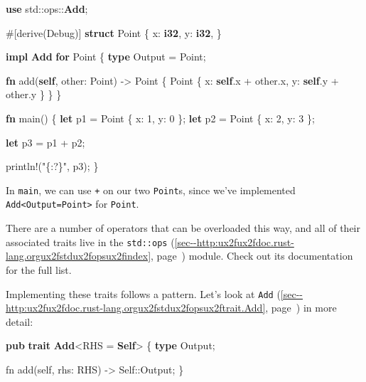 \documentclass[a4paper,]{book}
\renewcommand*{\hyperref}[2][\ar]{%
  \def\ar{#2}%
  #2 (\autoref{#1}, page~\pageref{#1})}
\newenvironment{Shaded}{\begin{snugshade}}{\end{snugshade}}
\newcommand{\KeywordTok}[1]{\textcolor[rgb]{0.13,0.29,0.53}{\textbf{{#1}}}}
\newcommand{\DecValTok}[1]{\textcolor[rgb]{0.00,0.00,0.81}{{#1}}}
\newcommand{\StringTok}[1]{\textcolor[rgb]{0.31,0.60,0.02}{{#1}}}
\newcommand{\OtherTok}[1]{\textcolor[rgb]{0.56,0.35,0.01}{{#1}}}
\newcommand{\NormalTok}[1]{{#1}}
\begin{document}
\begin{Shaded}
\begin{Highlighting}[]
\KeywordTok{use} \NormalTok{std::ops::}\KeywordTok{Add}\NormalTok{;}

\OtherTok{#[}\NormalTok{derive}\OtherTok{(}\NormalTok{Debug}\OtherTok{)]}
\KeywordTok{struct} \NormalTok{Point \{}
    \NormalTok{x: }\KeywordTok{i32}\NormalTok{,}
    \NormalTok{y: }\KeywordTok{i32}\NormalTok{,}
\NormalTok{\}}

\KeywordTok{impl} \KeywordTok{Add} \KeywordTok{for} \NormalTok{Point \{}
    \KeywordTok{type} \NormalTok{Output = Point;}

    \KeywordTok{fn} \NormalTok{add(}\KeywordTok{self}\NormalTok{, other: Point) -> Point \{}
        \NormalTok{Point \{ x: }\KeywordTok{self}\NormalTok{.x + other.x, y: }\KeywordTok{self}\NormalTok{.y + other.y \}}
    \NormalTok{\}}
\NormalTok{\}}

\KeywordTok{fn} \NormalTok{main() \{}
    \KeywordTok{let} \NormalTok{p1 = Point \{ x: }\DecValTok{1}\NormalTok{, y: }\DecValTok{0} \NormalTok{\};}
    \KeywordTok{let} \NormalTok{p2 = Point \{ x: }\DecValTok{2}\NormalTok{, y: }\DecValTok{3} \NormalTok{\};}

    \KeywordTok{let} \NormalTok{p3 = p1 + p2;}

    \OtherTok{println!}\NormalTok{(}\StringTok{"\{:?\}"}\NormalTok{, p3);}
\NormalTok{\}}
\end{Highlighting}
\end{Shaded}

In \texttt{main}, we can use \texttt{+} on our two \texttt{Point}s,
since we've implemented
\texttt{Add\textless{}Output=Point\textgreater{}} for \texttt{Point}.

There are a number of operators that can be overloaded this way, and all
of their associated traits live in the
\hyperref[sec--http:ux2fux2fdoc.rust-lang.orgux2fstdux2fopsux2findex]{\texttt{std::ops}}
module. Check out its documentation for the full list.

Implementing these traits follows a pattern. Let's look at
\hyperref[sec--http:ux2fux2fdoc.rust-lang.orgux2fstdux2fopsux2ftrait.Add]{\texttt{Add}}
in more detail:

\begin{Shaded}
\begin{Highlighting}[]
\KeywordTok{pub} \KeywordTok{trait} \KeywordTok{Add}\NormalTok{<RHS = }\KeywordTok{Self}\NormalTok{> \{}
    \KeywordTok{type} \NormalTok{Output;}

    \NormalTok{fn add(self, rhs: RHS) -> Self::Output;}
\NormalTok{\}}
\end{Highlighting}
\end{Shaded}
\end{document}

